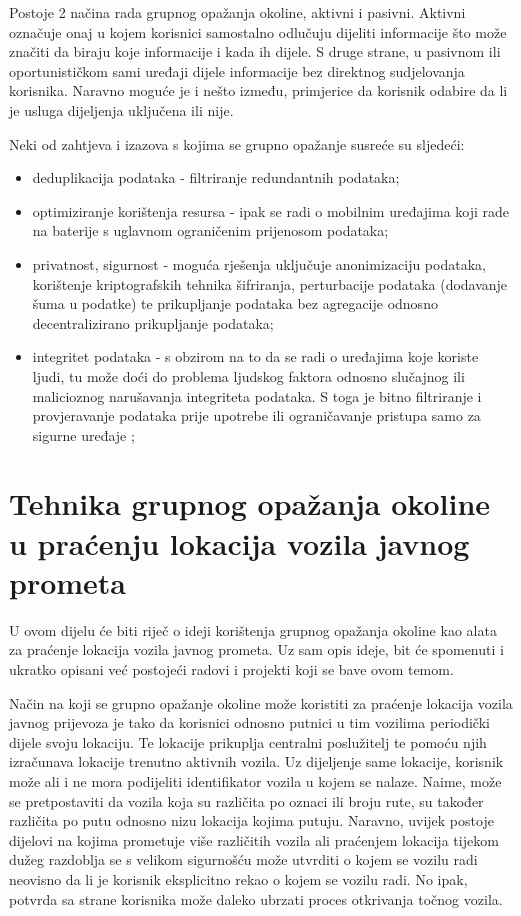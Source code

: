 \documentclass[times, utf8, diplomski]{fer}
\begin{document}
Postoje 2 načina rada grupnog opažanja okoline, aktivni i pasivni.
Aktivni označuje onaj u kojem korisnici samostalno odlučuju dijeliti informacije što može značiti da biraju koje informacije i kada ih dijele.
S druge strane, u pasivnom ili oportunističkom sami uređaji dijele informacije bez direktnog sudjelovanja korisnika. Naravno moguće je i nešto između, primjerice da korisnik odabire da li je usluga dijeljenja uključena ili nije.

Neki od zahtjeva i izazova s kojima se grupno opažanje susreće su sljedeći:
\begin{itemize}
    \item deduplikacija podataka - filtriranje redundantnih podataka;
    \item optimiziranje korištenja resursa - ipak se radi o mobilnim uređajima koji rade na baterije s uglavnom ograničenim prijenosom podataka;
    \item privatnost, sigurnost - moguća rješenja uključuje anonimizaciju podataka, korištenje kriptografskih tehnika šifriranja, perturbacije podataka (dodavanje šuma u podatke) te prikupljanje podataka bez agregacije odnosno decentralizirano prikupljanje podataka;
    \item integritet podataka - s obzirom na to da se radi o uređajima koje koriste ljudi, tu može doći do problema ljudskog faktora odnosno slučajnog ili malicioznog narušavanja integriteta podataka. S toga je bitno filtriranje i provjeravanje podataka prije upotrebe ili ograničavanje pristupa samo za sigurne uređaje ;
\end{itemize}


\section{Tehnika grupnog opažanja okoline u praćenju lokacija vozila javnog prometa} \label{section:crowdsensing_system}
U ovom dijelu će biti riječ o ideji korištenja grupnog opažanja okoline kao alata za praćenje lokacija vozila javnog prometa. Uz sam opis ideje, bit će spomenuti i ukratko opisani već postojeći radovi i projekti koji se bave ovom temom.

Način na koji se grupno opažanje okoline može koristiti za praćenje lokacija vozila javnog prijevoza je tako da korisnici odnosno putnici u tim vozilima periodički dijele svoju lokaciju. Te lokacije prikuplja centralni poslužitelj te pomoću njih izračunava lokacije trenutno aktivnih vozila. Uz dijeljenje same lokacije, korisnik može ali i ne mora podijeliti identifikator vozila u kojem se nalaze. Naime, može se pretpostaviti da vozila koja su različita po oznaci ili broju rute, su također različita po putu odnosno nizu lokacija kojima putuju. Naravno, uvijek postoje dijelovi na kojima prometuje više različitih vozila ali praćenjem lokacija tijekom dužeg razdoblja se s velikom sigurnošću može utvrditi o kojem se vozilu radi neovisno da li je korisnik eksplicitno rekao o kojem se vozilu radi. No ipak, potvrda sa strane korisnika može daleko ubrzati proces otkrivanja točnog vozila. 
\end{document}
